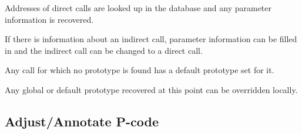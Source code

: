 \begin{DoxyEnumerate}
\item Addresses of direct calls are looked up in the database and any parameter information is recovered.
\item If there is information about an indirect call, parameter information can be filled in and the indirect call can be changed to a direct call.
\item Any call for which no prototype is found has a default prototype set for it.
\item Any global or default prototype recovered at this point can be overridden locally.
\end{DoxyEnumerate}\hypertarget{index_step4}{}\subsection{Adjust/\+Annotate P-\/code}\label{index_step4}

